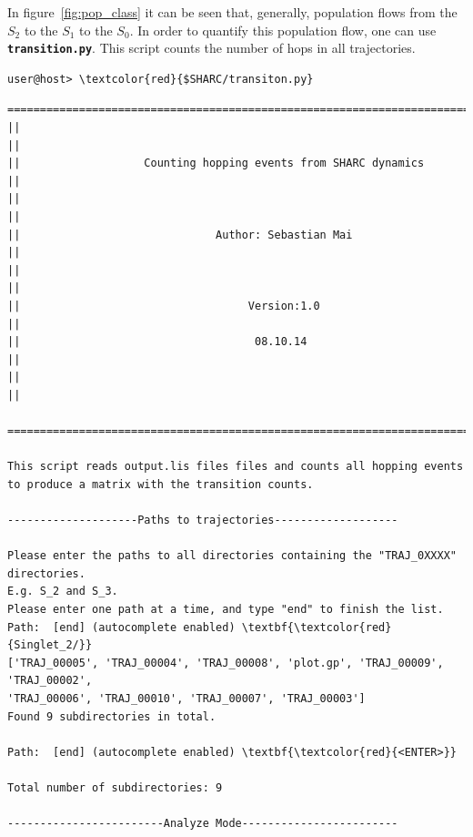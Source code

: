 \documentclass[a4paper,11pt,DIV=15,openany]{scrbook}
\newcommand{\ttt}[1]{\textbf{\texttt{#1}}}
\begin{document}
In figure~\ref{fig:pop_class} it can be seen that, generally, population flows from the $S_2$ to the $S_1$ to the $S_0$.
In order to quantify this population flow, one can use \ttt{transition.py}.
This script counts the number of hops in all trajectories.

\begin{Verbatim}[commandchars=\\\{\}]
user@host> \textcolor{red}{$SHARC/transiton.py}
\end{Verbatim}

\begin{oframed}
\footnotesize\begin{Verbatim}[commandchars=\\\{\}]
  ================================================================================
||                                                                                ||
||                   Counting hopping events from SHARC dynamics                  ||
||                                                                                ||
||                              Author: Sebastian Mai                             ||
||                                                                                ||
||                                   Version:1.0                                  ||
||                                    08.10.14                                    ||
||                                                                                ||
  ================================================================================

This script reads output.lis files files and counts all hopping events
to produce a matrix with the transition counts.
  
--------------------Paths to trajectories-------------------

Please enter the paths to all directories containing the "TRAJ_0XXXX" directories.
E.g. S_2 and S_3. 
Please enter one path at a time, and type "end" to finish the list.
Path:  [end] (autocomplete enabled) \textbf{\textcolor{red}{Singlet_2/}}
['TRAJ_00005', 'TRAJ_00004', 'TRAJ_00008', 'plot.gp', 'TRAJ_00009', 'TRAJ_00002', 
'TRAJ_00006', 'TRAJ_00010', 'TRAJ_00007', 'TRAJ_00003']
Found 9 subdirectories in total.

Path:  [end] (autocomplete enabled) \textbf{\textcolor{red}{<ENTER>}}

Total number of subdirectories: 9

------------------------Analyze Mode------------------------


\end{Verbatim}
\end{oframed}
\end{document}
